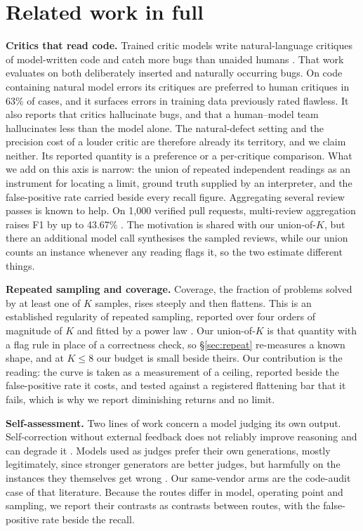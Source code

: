 \section{Related work in full}
\label{sec:related-full}

\textbf{Critics that read code.} Trained critic models write natural-language critiques of
model-written code and catch more bugs than unaided humans \citep{mcaleese2024critics}. That work
evaluates on both deliberately inserted and naturally occurring bugs. On code containing natural
model errors its critiques are preferred to human critiques in 63\% of cases, and it surfaces
errors in training data previously rated flawless. It also reports that critics hallucinate bugs,
and that a human--model team hallucinates less than the model alone. The natural-defect setting
and the precision cost of a louder critic are therefore already its territory, and we claim
neither. Its reported quantity is a preference or a per-critique comparison. What we add on this
axis is narrow: the union of repeated independent readings as an instrument for locating a limit,
ground truth supplied by an interpreter, and the false-positive rate carried beside every recall
figure. Aggregating several review passes is known to help. On 1{,}000 verified pull requests,
multi-review aggregation raises F1 by up to 43.67\% \citep{zeng2025swrbench}. The motivation is
shared with our union-of-$K$, but there an additional model call synthesises the sampled reviews,
while our union counts an instance whenever any reading flags it, so the two estimate different
things.

\textbf{Repeated sampling and coverage.} Coverage, the fraction of problems solved by at least one
of $K$ samples, rises steeply and then flattens. This is an established regularity of repeated
sampling, reported over four orders of magnitude of $K$ and fitted by a power law
\citep{brown2024monkeys}. Our union-of-$K$ is that quantity with a flag rule in place of a
correctness check, so \S\ref{sec:repeat} re-measures a known shape, and at $K \le 8$ our budget is
small beside theirs. Our contribution is the reading: the curve is taken as a measurement of a
ceiling, reported beside the false-positive rate it costs, and tested against a registered
flattening bar that it fails, which is why we report diminishing returns and no limit.

\textbf{Self-assessment.} Two lines of work concern a model judging its own output. Self-correction
without external feedback does not reliably improve reasoning and can degrade it
\citep{huang2024selfcorrect}. Models used as judges prefer their own generations, mostly
legitimately, since stronger generators are better judges, but harmfully on the instances they
themselves get wrong \citep{chen2025selfpreference}. Our same-vendor arms are the code-audit case of
that literature. Because the routes differ in model, operating point and sampling, we report their
contrasts as contrasts between routes, with the false-positive rate beside the recall.

